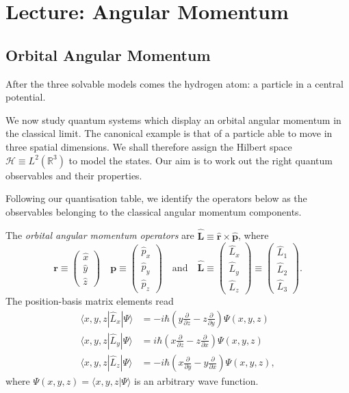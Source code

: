 \section{Lecture: Angular Momentum}

\subsection{Orbital Angular Momentum}
After the three solvable models comes the hydrogen atom: a particle in a central potential.

We now study quantum systems which display an orbital angular momentum in the classical limit. The canonical example is that of a particle able to move in three spatial dimensions. We shall therefore assign the Hilbert space $\mathcal{H} \equiv L^2(\mathbb{R}^3)$ to model the states. Our aim is to work out the right quantum observables and their properties.

Following our quantisation table, we identify the operators below as the observables belonging to the classical angular momentum components.
\begin{definition}
	The \emph{orbital angular momentum operators} are $\widehat{\mathbf{L}} \equiv \widehat{\mathbf{r}}\times \widehat{\mathbf{p}}$, where 
	\begin{equation}
		\mathbf{r} \equiv \begin{pmatrix}
			\widehat{x} \\
			\widehat{y} \\
			\widehat{z} 
		\end{pmatrix}\quad
		\mathbf{p} \equiv \begin{pmatrix}
			\widehat{p}_x \\
			\widehat{p}_y \\
			\widehat{p}_z 
		\end{pmatrix}\quad\text{and}\quad \widehat{\mathbf{L}} \equiv \begin{pmatrix}
			\widehat{L}_x \\
			\widehat{L}_y \\
			\widehat{L}_z 
		\end{pmatrix} \equiv \begin{pmatrix}
			\widehat{L}_1 \\
			\widehat{L}_2 \\
			\widehat{L}_3 
		\end{pmatrix}.
	\end{equation}
	The position-basis matrix elements read  
	\begin{align}
		\langle x,y,z|\widehat{L}_x|\Psi\rangle &= -i{\hbar} \left(y\frac{\partial}{\partial z} - z\frac{\partial}{\partial y} \right)\Psi(x,y,z) \\
		\langle x,y,z|\widehat{L}_y|\Psi\rangle &=  i{\hbar} \left(x\frac{\partial}{\partial z} - z\frac{\partial}{\partial x} \right)\Psi(x,y,z) \\
		\langle x,y,z|\widehat{L}_z|\Psi\rangle &=  -i{\hbar} \left(x\frac{\partial}{\partial y} - y\frac{\partial}{\partial x} \right)\Psi(x,y,z),
	\end{align}
	where $\Psi(x,y,z) = \langle x,y,z|\Psi\rangle$ is an arbitrary wave function. 
\end{definition}

